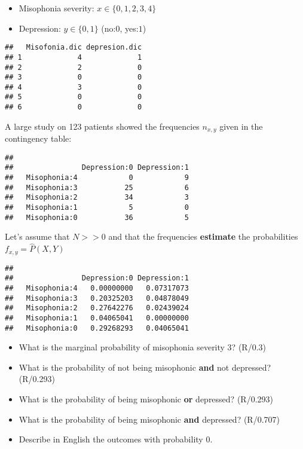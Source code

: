 \documentclass[
]{book}
\providecommand{\tightlist}{%
  \setlength{\itemsep}{0pt}\setlength{\parskip}{0pt}}
\begin{document}
\begin{itemize}
\tightlist
\item
  Misophonia severity: \(x\in \{0,1,2,3,4\}\)
\item
  Depression: \(y\in \{0,1\}\) (no:\(0\), yes:\(1\))
\end{itemize}

\begin{verbatim}
##   Misofonia.dic depresion.dic
## 1             4             1
## 2             2             0
## 3             0             0
## 4             3             0
## 5             0             0
## 6             0             0
\end{verbatim}

A large study on 123 patients showed the frequencies \(n_{x,y}\) given in the contingency table:

\begin{verbatim}
##               
##                Depression:0 Depression:1
##   Misophonia:4            0            9
##   Misophonia:3           25            6
##   Misophonia:2           34            3
##   Misophonia:1            5            0
##   Misophonia:0           36            5
\end{verbatim}

Let's assume that \(N>>0\) and that the frequencies \textbf{estimate} the probabilities \(f_{x,y}=\hat{P}(X, Y)\)

\begin{verbatim}
##               
##                Depression:0 Depression:1
##   Misophonia:4   0.00000000   0.07317073
##   Misophonia:3   0.20325203   0.04878049
##   Misophonia:2   0.27642276   0.02439024
##   Misophonia:1   0.04065041   0.00000000
##   Misophonia:0   0.29268293   0.04065041
\end{verbatim}

\begin{itemize}
\tightlist
\item
  What is the marginal probability of misophonia severity 3? (R/0.3)
\item
  What is the probability of not being misophonic \textbf{and} not depressed? (R/0.293)
\item
  What is the probability of being misophonic \textbf{or} depressed? (R/0.293)
\item
  What is the probability of being misophonic \textbf{and} depressed? (R/0.707)
\item
  Describe in English the outcomes with probability 0.
\end{itemize}
\end{document}
